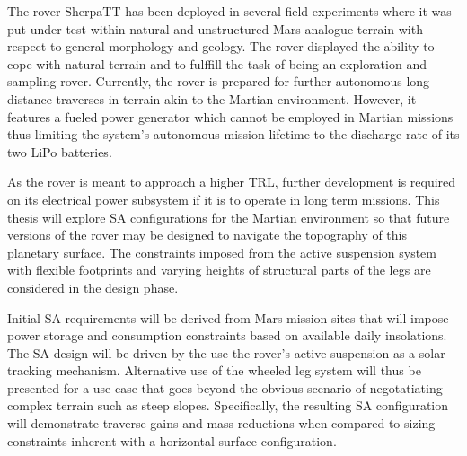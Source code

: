 The rover SherpaTT has been deployed in several field experiments where it was put under test within natural and unstructured Mars analogue terrain with respect to general morphology and geology. The rover displayed the ability to cope with natural terrain and to fulffill the task of being an exploration and sampling rover. Currently, the rover is prepared for further autonomous long distance traverses in terrain akin to the Martian environment. However, it features a fueled power generator which cannot be employed in Martian missions thus limiting the system's autonomous mission lifetime to the discharge rate of its two LiPo batteries.

As the rover is meant to approach a higher \ac{TRL}, further development is required on its electrical power subsystem if it is to operate in long term missions. This thesis will explore \ac{SA} configurations for the Martian environment so that future versions of the rover may be designed to navigate the topography of this planetary surface. The constraints imposed from the active suspension system with flexible footprints and varying heights of structural parts of the legs are considered in the design phase.

Initial \ac{SA} requirements will be derived from Mars mission sites that will impose power storage and consumption constraints based on available daily insolations. The \ac{SA} design will be driven by the use the rover's active suspension as a solar tracking mechanism. Alternative use of the wheeled leg system will thus be presented for a use case that goes beyond the obvious scenario of negotatiating complex terrain such as steep slopes. Specifically, the resulting \ac{SA} configuration will demonstrate traverse gains and mass reductions when compared to sizing constraints inherent with a horizontal surface configuration.





